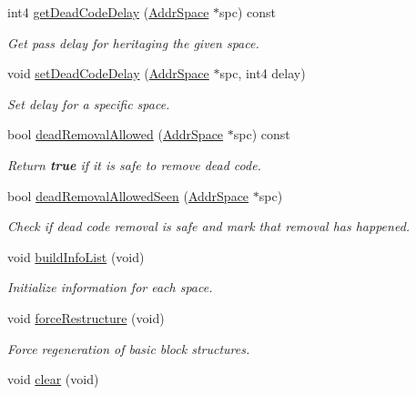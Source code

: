 \begin{DoxyCompactItemize}
int4 \mbox{\hyperlink{class_heritage_a4f3d2a0674635a527b72ff6b96774f33}{get\+Dead\+Code\+Delay}} (\mbox{\hyperlink{class_addr_space}{Addr\+Space}} $\ast$spc) const
\begin{DoxyCompactList}\small\item\em Get pass delay for heritaging the given space. \end{DoxyCompactList}\item 
void \mbox{\hyperlink{class_heritage_a8377c55d2b77f230779ad43e341e6a29}{set\+Dead\+Code\+Delay}} (\mbox{\hyperlink{class_addr_space}{Addr\+Space}} $\ast$spc, int4 delay)
\begin{DoxyCompactList}\small\item\em Set delay for a specific space. \end{DoxyCompactList}\item 
bool \mbox{\hyperlink{class_heritage_a664720f99b5b26c63a5f0349f4a83a0c}{dead\+Removal\+Allowed}} (\mbox{\hyperlink{class_addr_space}{Addr\+Space}} $\ast$spc) const
\begin{DoxyCompactList}\small\item\em Return {\bfseries{true}} if it is {\itshape safe} to remove dead code. \end{DoxyCompactList}\item 
bool \mbox{\hyperlink{class_heritage_a2bbf92b2085d45de9f3920824a51786c}{dead\+Removal\+Allowed\+Seen}} (\mbox{\hyperlink{class_addr_space}{Addr\+Space}} $\ast$spc)
\begin{DoxyCompactList}\small\item\em Check if dead code removal is safe and mark that removal has happened. \end{DoxyCompactList}\item 
void \mbox{\hyperlink{class_heritage_a7cca3fa6fe1e5d6241ca3e0f0a29af42}{build\+Info\+List}} (void)
\begin{DoxyCompactList}\small\item\em Initialize information for each space. \end{DoxyCompactList}\item 
void \mbox{\hyperlink{class_heritage_ad3b79b20f375f99c6ed06fc5941cccd5}{force\+Restructure}} (void)
\begin{DoxyCompactList}\small\item\em Force regeneration of basic block structures. \end{DoxyCompactList}\item 
void \mbox{\hyperlink{class_heritage_a7cdea4058aa42f91bbdb5a9b3171950f}{clear}} (void)

\end{DoxyCompactItemize}
